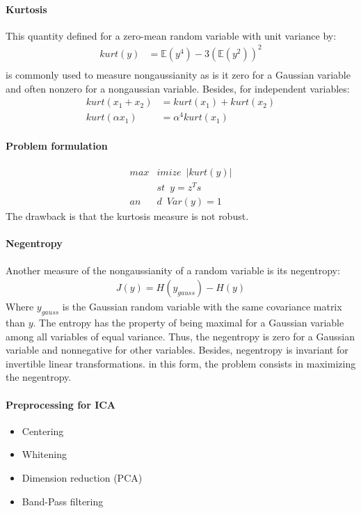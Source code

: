 \documentclass[a4paper,twoside,10pt]{article}
\begin{document}
\paragraph{Kurtosis} This quantity defined for a zero-mean random variable with unit variance by:
\begin{align*}
kurt(y) &= \mathbb{E}(y^4)-3(\mathbb{E}(y^2))^2\\
\end{align*}
is commonly used to measure nongaussianity as is it zero for a Gaussian variable and often nonzero for a nongaussian variable. Besides, for independent variables:
\begin{align*}
kurt(x_1+x_2) &= kurt(x_1) + kurt(x_2)\\
kurt(\alpha x_1) &= \alpha^4 kurt(x_1)
\end{align*}

\paragraph{Problem formulation}
\begin{align*}
max&imize \enspace |kurt(y)|\\
&st \enspace y = z^Ts\\
an&d \enspace Var(y)=1
\end{align*}
The drawback is that the kurtosis measure is not robust.

\paragraph{Negentropy} Another measure of the nongaussianity of a random variable is its negentropy:
\begin{align*}
J(y) = H(y_{gauss})-H(y)
\end{align*}
Where $y_{gauss}$ is the Gaussian random variable with the same covariance matrix than $y$. The entropy has the property of being maximal for a Gaussian variable among all variables of equal variance. Thus, the negentropy is zero for a Gaussian variable and nonnegative for other variables. Besides, negentropy is invariant for invertible linear transformations. in this form, the problem consists in maximizing the negentropy.

\paragraph{Preprocessing for ICA}
\begin{itemize}
\item Centering
\item Whitening
\item Dimension reduction (PCA)
\item Band-Pass filtering
\end{itemize}
\end{document}
